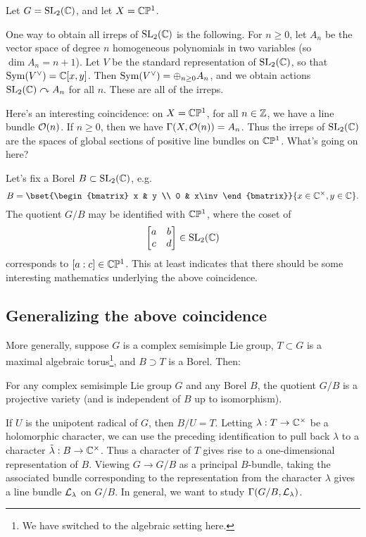 \documentclass{article}
\begin{document}
Let $G = \mathrm{SL}_2(\mathbb{C})$, and let $X = \mathbb{C}\mathbb{P}^1$.

One way to obtain all irreps of $\mathrm{SL}_2(\mathbb{C})$ is the following.
For $n \geq 0$, let $A_n$ be the vector space of degree $n$ homogeneous polynomials in two variables (so $\dim A_n = n + 1$).
Let $V$ be the standard representation of $\mathrm{SL}_2(\mathbb{C})$, so that $\operatorname{Sym} (V^\vee) = \mathbb{C}[x, y]$.
Then $\operatorname{Sym} (V^\vee) = \oplus_{n \geq 0} A_n$, and we obtain actions $\mathrm{SL}_2(\mathbb{C}) \curvearrowright A_n$ for all $n$.
These are all of the irreps.

Here's an interesting coincidence: on $X = \mathbb{C}\mathbb{P}^1$, for all $n \in \mathbb{Z}$, we have a line bundle $\mathcal{O}(n)$.
If $n \geq 0$, then we have $\Gamma(X, \mathcal{O}(n)) = A_n$.
Thus the irreps of $\mathrm{SL}_2(\mathbb{C})$ are the spaces of global sections of positive line bundles on $\mathbb{C}\mathbb{P}^1$.
What's going on here?

Let's fix a Borel $B \subset \mathrm{SL}_2(\mathbb{C})$, e.g.\
\[
	B = \bset{\begin{bmatrix} x & y \\ 0 & x\inv \end{bmatrix}}{x \in \CC^\times, y \in \CC}.
\]
The quotient $G / B$ may be identified with $\mathbb{C}\mathbb{P}^1$, where the coset of 
\[
	\begin{bmatrix} a & b \\ c & d \end{bmatrix} \in \mathrm{SL}_2(\mathbb{C})
\]
corresponds to $[a : c] \in \mathbb{C}\mathbb{P}^1$.
This at least indicates that there should be some interesting mathematics underlying the above coincidence.

\subsection{Generalizing the above coincidence}

More generally, suppose $G$ is a complex semisimple Lie group, $T \subset G$ is a maximal algebraic torus\footnote{We have switched to the algebraic setting here.}, and $B \supset T$ is a Borel.
Then:

\begin{thm}
	For any complex semisimple Lie group $G$ and any Borel $B$, the quotient $G / B$ is a projective variety (and is independent of $B$ up to isomorphism).
\end{thm}

If $U$ is the unipotent radical of $G$, then $B / U = T$.
Letting $\lambda: T \to \mathbb{C}^\times$ be a holomorphic character, we can use the preceding identification to pull back $\lambda$ to a character $\tilde{\lambda}: B \to \mathbb{C}^\times$.
Thus a character of $T$ gives rise to a one-dimensional representation of $B$.
Viewing $G \to G / B$ as a principal $B$-bundle, taking the associated bundle corresponding to the representation from the character $\lambda$ gives a line bundle $\mathcal{L}_\lambda$ on $G / B$.
In general, we want to study $\Gamma(G / B, \mathcal{L}_\lambda)$.
\end{document}
